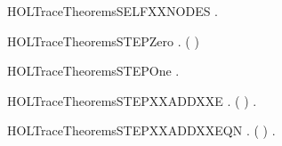 \newcommand{\HOLTraceTheoremsReachXXtrans}{\UseVerbatim{HOLTraceTheoremsReachXXtrans}}
\begin{SaveVerbatim}{HOLTraceTheoremsSELFXXNODES}
\HOLTokenTurnstile{} \HOLSymConst{\HOLTokenForall{}}.  \HOLConst{\HOLTokenIn{}}  
\end{SaveVerbatim}
\newcommand{\HOLTraceTheoremsSELFXXNODES}{\UseVerbatim{HOLTraceTheoremsSELFXXNODES}}
\begin{SaveVerbatim}{HOLTraceTheoremsSTEPZero}
\HOLTokenTurnstile{} \HOLSymConst{\HOLTokenForall{}} .     \HOLSymConst{\HOLTokenEquiv{}} ( \HOLSymConst{=} )
\end{SaveVerbatim}
\newcommand{\HOLTraceTheoremsSTEPZero}{\UseVerbatim{HOLTraceTheoremsSTEPZero}}
\begin{SaveVerbatim}{HOLTraceTheoremsSTEPOne}
\HOLTokenTurnstile{}     \HOLSymConst{\HOLTokenEquiv{}} \HOLSymConst{\HOLTokenExists{}}.  \HOLTokenTransBegin{}\HOLTokenTransEnd {}
\end{SaveVerbatim}
\newcommand{\HOLTraceTheoremsSTEPOne}{\UseVerbatim{HOLTraceTheoremsSTEPOne}}
\begin{SaveVerbatim}{HOLTraceTheoremsSTEPXXADDXXE}
\HOLTokenTurnstile{} \HOLSymConst{\HOLTokenForall{}}   .   ( \HOLSymConst{\ensuremath{+}} )  \HOLSymConst{\HOLTokenImp{}} \HOLSymConst{\HOLTokenExists{}}.     \HOLSymConst{\HOLTokenConj{}}    
\end{SaveVerbatim}
\newcommand{\HOLTraceTheoremsSTEPXXADDXXE}{\UseVerbatim{HOLTraceTheoremsSTEPXXADDXXE}}
\begin{SaveVerbatim}{HOLTraceTheoremsSTEPXXADDXXEQN}
\HOLTokenTurnstile{} \HOLSymConst{\HOLTokenForall{}}   .   ( \HOLSymConst{\ensuremath{+}} )  \HOLSymConst{\HOLTokenEquiv{}} \HOLSymConst{\HOLTokenExists{}}.     \HOLSymConst{\HOLTokenConj{}}    
\end{SaveVerbatim}
